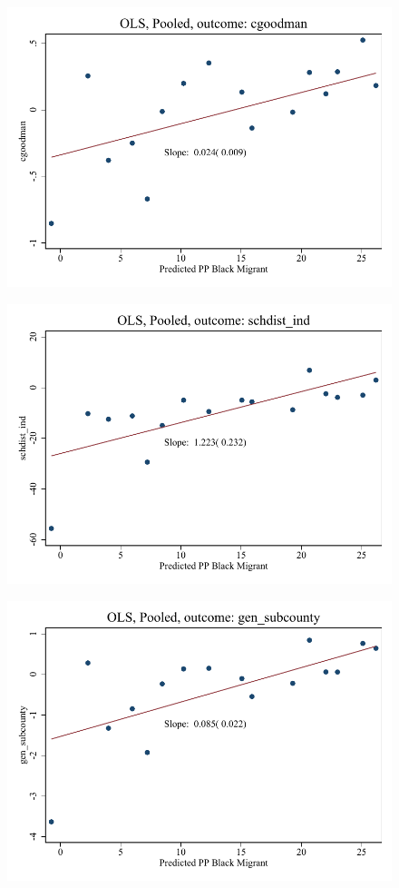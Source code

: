 \documentclass{article}
\begin{document}
\begin{figure}
	\centering
	\includegraphics[width=.8\textwidth]{figures/binscatter/pooled_cgoodman_ols.pdf}
\end{figure}
\clearpage
\begin{figure}
	\centering
	\includegraphics[width=.8\textwidth]{figures/binscatter/pooled_schdist_ind_ols.pdf}
\end{figure}
\clearpage
\begin{figure}
	\centering
	\includegraphics[width=.8\textwidth]{figures/binscatter/pooled_gen_subcounty_ols.pdf}
\end{figure}
\end{document}
